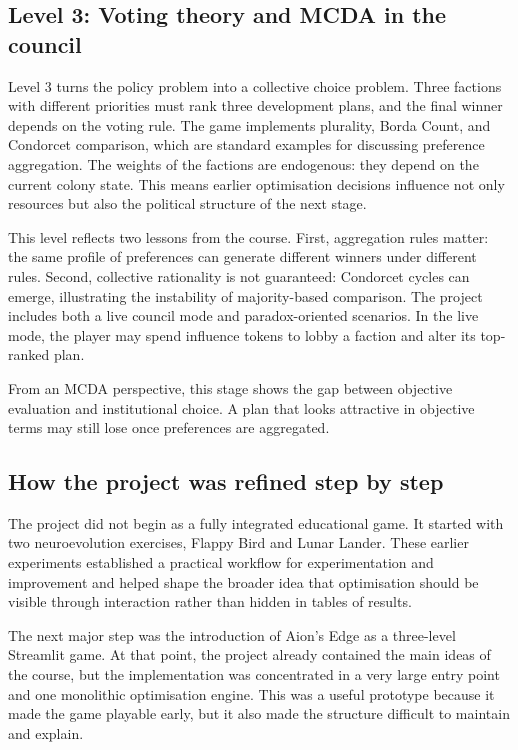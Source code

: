 \subsection{Level 3: Voting theory and MCDA in the council}

Level 3 turns the policy problem into a collective choice problem. Three
factions with different priorities must rank three development plans,
and the final winner depends on the voting rule. The game implements
plurality, Borda Count, and Condorcet comparison, which are standard
examples for discussing preference aggregation. The weights of the
factions are endogenous: they depend on the current colony state. This
means earlier optimisation decisions influence not only resources but
also the political structure of the next stage.

This level reflects two lessons from the course. First, aggregation
rules matter: the same profile of preferences can generate different
winners under different rules. Second, collective rationality is not
guaranteed: Condorcet cycles can emerge, illustrating the instability
of majority-based comparison. The
project includes both a live council mode and paradox-oriented
scenarios. In the live mode, the player may spend influence tokens to
lobby a faction and alter its top-ranked plan.

From an MCDA perspective, this stage shows the gap between objective
evaluation and institutional choice. A plan that looks attractive in
objective terms may still lose once preferences are aggregated.

\subsection{How the project was refined step by step}

The project did not begin as a fully integrated educational game. It
started with two neuroevolution exercises, Flappy Bird and Lunar
Lander. These earlier experiments established a practical workflow for
experimentation and improvement and helped shape the broader idea that
optimisation should be visible through interaction rather than hidden in
tables of results.

The next major step was the introduction of Aion's Edge as a three-level
Streamlit game. At that point, the project already contained the main
ideas of the course, but the implementation was concentrated in a very
large entry point and one monolithic optimisation engine. This was a
useful prototype because it made the game playable early, but it also
made the structure difficult to maintain and explain.

